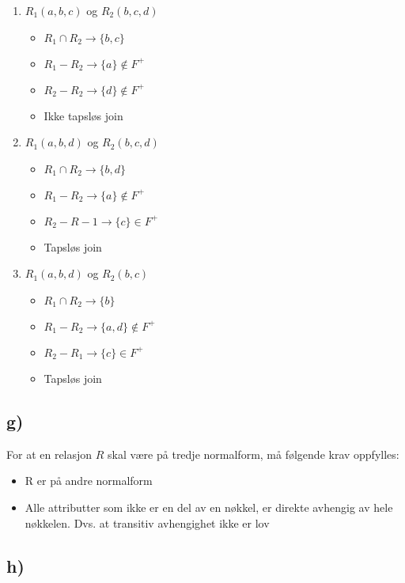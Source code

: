 \documentclass[a4paper, 12pt] {article}
\begin{document}
\begin{enumerate}
\item $R_1(a,b,c)$ og $R_2(b,c,d)$
    \begin{itemize}
        \item $R_1 \cap R_2 \rightarrow \{b,c\}$
        \item $R_1 - R_2 \rightarrow \{a\} \notin F^+$
        \item $R_2 - R_2 \rightarrow \{d\} \notin F^+$
        \item Ikke tapsløs join
    \end{itemize}
\item $R_1(a,b,d)$ og $R_2(b,c,d)$
    \begin{itemize}
        \item $R_1 \cap R_2 \rightarrow \{b,d\}$
        \item $R_1 - R_2 \rightarrow \{a\} \notin F^+$
        \item $R_2 - R-1 \rightarrow \{c\} \in F^+$
        \item Tapsløs join
    \end{itemize}
\item $R_1(a,b,d)$ og $R_2(b,c)$
    \begin{itemize}
    \item $R_1 \cap R_2 \rightarrow \{b\}$
    \item $R_1 - R_2 \rightarrow \{a,d\} \notin F^+$
    \item $R_2 - R_1 \rightarrow \{c\} \in F^+$
    \item Tapsløs join
    \end{itemize}
\end{enumerate}

\subsection{g)}

For at en relasjon $R$ skal være på tredje normalform, må følgende krav oppfylles:

\begin{itemize}
\item R er på andre normalform
\item Alle attributter som ikke er en del av en nøkkel, er direkte avhengig av hele nøkkelen. Dvs. at transitiv avhengighet ikke er lov
\end{itemize}

\subsection{h)}
\end{document}
